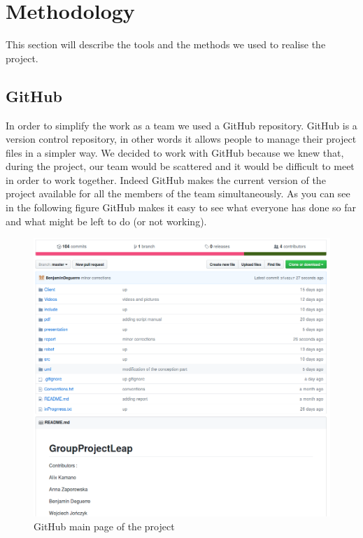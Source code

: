 \section{Methodology}

This section will describe the tools and the methods we used to realise the project.

\subsection{GitHub}

In order to simplify the work as a team we used a GitHub repository. GitHub is a version control repository, in other words it allows people to manage their project files in a simpler way. We decided to work with GitHub because we knew that, during the project, our team would be scattered and it would be difficult to meet in order to work together. Indeed GitHub makes the current version of the project available for all the members of the team simultaneously. As you can see in the following figure GitHub makes it easy to see what everyone has done so far and what might be left to do (or not working).


\begin{figure}[H]
	\includegraphics[scale = 0.35]{github}
	\centering
	\caption{GitHub main page of the project}
	\label{fig:github}
\end{figure}

